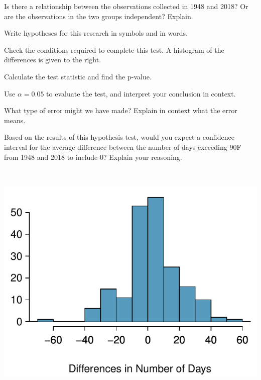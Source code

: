 {	\noindent%
	\begin{minipage}[c]{0.65\textwidth}
		\begin{parts}
			\item
			Is there a relationship between the observations collected
			in 1948 and 2018?
			Or are the observations in the two groups independent?
			Explain.
			\item
			Write hypotheses for this research in symbols and in words.
			\item
			Check the conditions required to complete this test.
			A histogram of the differences is given to the right.
			\item
			Calculate the test statistic and find the p-value.
			\item
			Use $\alpha = 0.05$ to evaluate the test,
			and interpret your conclusion in context.
			\item
			What type of error might we have made?
			Explain in context what the error means.
			\item
			Based on the results of this hypothesis test,
			would you expect a confidence interval for the
			average difference between the number of days
			exceeding 90\textdegree{}F from 1948 and 2018
			to include 0?
			Explain your reasoning.
		\end{parts}
	\end{minipage}
	\begin{minipage}[c]{0.02\textwidth}
		\ 
	\end{minipage}
	\begin{minipage}[c]{0.32\textwidth}
		\includegraphics[width=\textwidth]{ch_inference_for_means_oi_biostat/figures/eoce/global_warming_v2_1/global_warming_v2_1_diffs}
	\end{minipage}
}{}

